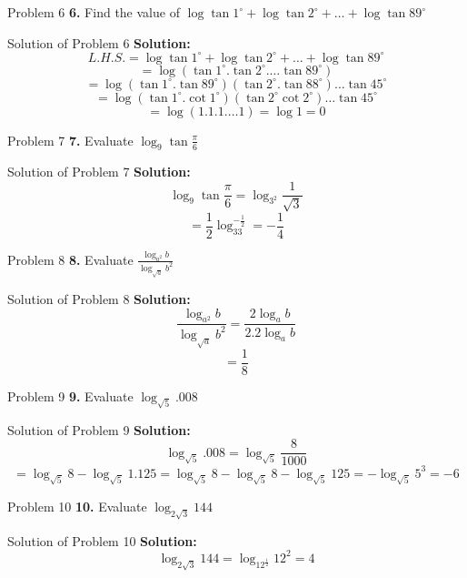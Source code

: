 \documentclass[aspectratio=1610,8pt]{beamer}
\begin{document}
\begin{frame}{Problem 6}
  \textbf{6.} Find the value of $\log\tan1^\circ + \log\tan2^\circ + \ldots + \log\tan89^\circ$
\end{frame}
\begin{frame}{Solution of Problem 6}
  \textbf{Solution:}$$L.H.S. = \log\tan1^\circ + \log\tan2^\circ + \ldots + \log\tan89^\circ$$
  $$= \log(\tan1^\circ .\tan2^\circ . \ldots \tan89^\circ)$$
  $$= \log(\tan1^\circ.\tan89^\circ)(\tan2^\circ.\tan88^\circ)\ldots\tan45^\circ$$
  $$= \log(\tan1^\circ.\cot1^\circ)(\tan2^\circ\cot2^\circ)\ldots\tan45^\circ$$
  $$= \log(1.1.1.\ldots1) = \log 1 = 0$$
\end{frame}
\begin{frame}{Problem 7}
  \textbf{7.} Evaluate $\log_9\tan\frac{\pi}{6}$
\end{frame}
\begin{frame}{Solution of Problem 7}
  \textbf{Solution:} $$\log_9\tan\frac{\pi}{6} = \log_{3^2}\frac{1}{\sqrt{3}}$$
  $$= \frac{1}{2}\log_33^{-\frac{1}{2}} = -\frac{1}{4}$$
\end{frame}
\begin{frame}{Problem 8}
  \textbf{8.} Evaluate $\frac{\log_{a^2}b}{\log_{\sqrt{a}}b^2}$
\end{frame}
\begin{frame}{Solution of Problem 8}
  \textbf{Solution:} $$\frac{\log_{a^2}b}{\log_{\sqrt{a}}b^2} = \frac{2\log_a b}{2.2\log_a b}$$
  $$= \frac{1}{8}$$
\end{frame}
\begin{frame}{Problem 9}
  \textbf{9.} Evaluate $\log_{\sqrt{5}}.008$
\end{frame}
\begin{frame}{Solution of Problem 9}
  \textbf{Solution:} $$\log_{\sqrt{5}}.008 = \log_{\sqrt{5}} \frac{8}{1000}$$
  $$= \log_{\sqrt{5}}8 - \log_{\sqrt{5}}1.125 = \log_{\sqrt{5}}8 - \log_{\sqrt{5}}8 - \log_{\sqrt{5}}125 = -\log_{\sqrt{5}}5^3 = -6$$
\end{frame}
\begin{frame}{Problem 10}
  \textbf{10.} Evaluate $\log_{2\sqrt{3}}144$
\end{frame}
\begin{frame}{Solution of Problem 10}
  \textbf{Solution:}$$\log_{2\sqrt{3}}144 = \log_{12^{\frac{1}{2}}}12^2 = 4$$
\end{frame}
\end{document}
